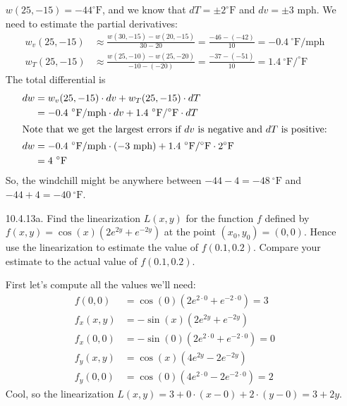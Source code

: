 \begin{enumerate}[leftmargin=0pt]
\begin{red}
$w(25, -15) = -44 ^\circ\textrm{F}$, and we know that $dT = \pm 2 ^\circ\textrm{F}$ and $dv = \pm 3$ mph. We need to estimate the partial derivatives:
\begin{align*}
    w_v(25, -15) &\approx \frac{w(30, -15) - w(20, -15)}{30-20} = \frac{-46-(-42)}{10} = -0.4\ ^\circ\textrm{F} / \textrm{mph}\\
    w_T(25, -15) &\approx \frac{w(25, -10) - w(25, -20)}{-10-(-20)} = \frac{-37-(-51)}{10} = 1.4\ ^\circ\textrm{F} / ^\circ\textrm{F}
\end{align*}
The total differential is
\begin{align*}
dw &=  w_v(25, -15) \cdot dv +  w_T(25, -15)\cdot dT \\
&= -0.4\ ^\circ\textrm{F} / \textrm{mph} \cdot dv 
+  1.4\ ^\circ\textrm{F} / ^\circ\textrm{F} \cdot dT \\
\intertext{Note that we get the largest errors if $dv$ is negative and $dT$ is positive:}
dw &= -0.4\ ^\circ\textrm{F} / \textrm{mph} \cdot (-3 \textrm{ mph}) 
+  1.4\ ^\circ\textrm{F} / ^\circ\textrm{F} \cdot 2 ^\circ\textrm{F} \\
&= 4\ ^\circ\textrm{F}
\end{align*}
So, the windchill might be anywhere between $-44 - 4 = -48\ ^\circ\textrm{F}$ and $-44+4 = -40\ ^\circ\textrm{F}$.
\end{red}

    \item[10.4.13a.] Find the linearization $L(x,y)$ for the function $f$ defined by $f(x,y) = \cos(x)(2e^{2y}+e^{-2y})$ at the point $(x_0, y_0) = (0, 0)$. Hence use the linearization to estimate the value of $f(0.1, 0.2)$. Compare your estimate to the actual value of $f(0.1, 0.2)$.
        
        \begin{red}
        First let's compute all the values we'll need:
        \begin{align*}
            f(0, 0) &= \cos(0)(2e^{2\cdot 0}+e^{-2\cdot 0}) = 3 \\
            f_x(x,y) &= -\sin(x)(2e^{2y}+e^{-2y}) \\
            f_x(0,0) &= -\sin(0)(2e^{2\cdot 0}+e^{-2\cdot 0}) = 0 \\
            f_y(x, y) &= \cos(x)(4e^{2y}-2e^{-2y}) \\
            f_y(0, 0) &= \cos(0)(4e^{2\cdot 0}-2e^{-2\cdot 0}) = 2
        \end{align*}
        Cool, so the linearization $L(x, y) = 3 + 0\cdot(x-0) + 2\cdot(y-0) = 3 + 2y.$
        

\end{red}
\end{enumerate}
